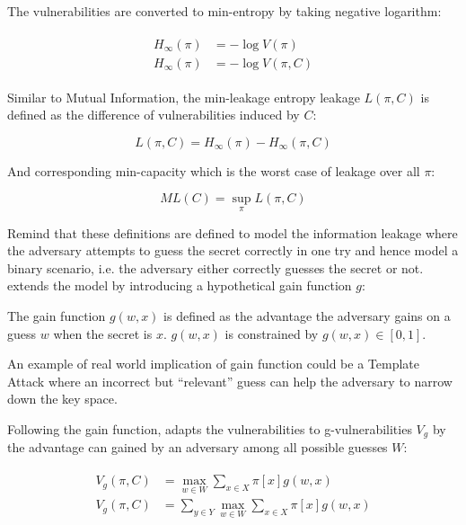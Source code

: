 \begin{definition}
	The vulnerabilities are converted to min-entropy by taking negative logarithm:
	
	\begin{eqnarray}
		\begin{aligned}
			H_{\infty}(\pi) &= -\log{V(\pi)} \\
			H_{\infty}(\pi) &= -\log{V(\pi,C)}
		\end{aligned}
	\end{eqnarray}
	
	Similar to Mutual Information, the min-leakage entropy leakage $L(\pi,C)$ is defined as the difference of vulnerabilities induced by $C$:
	
	\begin{equation}
		L(\pi, C) = H_{\infty}(\pi) - H_{\infty}(\pi, C)
	\end{equation}
	
	And corresponding min-capacity which is the worst case of leakage over all $\pi$:
	
	\begin{equation}
		ML(C) = \sup_{\pi}{L(\pi,C)}
	\end{equation}
\end{definition}

Remind that these definitions are defined to model the information leakage where the adversary attempts to guess the secret correctly in one try and hence model a binary scenario, i.e. the adversary either correctly guesses the secret or not. \cite{GLeakage} extends the model by introducing a hypothetical gain function $g$:

\begin{definition}
	The gain function $g(w,x)$ is defined as the advantage the adversary gains on a guess $w$ when the secret is $x$. $g(w,x)$ is constrained by $g(w,x) \in [0,1]$.
\end{definition}

An example of real world implication of gain function could be a Template Attack\cite{TemplateAttack} \cite{PracticalTemplate} where an incorrect but ``relevant'' guess can help the adversary to narrow down the key space.

Following the gain function, \cite{GLeakage} adapts the vulnerabilities to g-vulnerabilities $V_g$ by the advantage can gained by an adversary among all possible guesses $W$:

\begin{eqnarray}
	\begin{aligned}
		V_{g}(\pi, C) &= \max_{w \in W}\sum_{x \in X}{\pi[x]g(w,x)} \\
		V_{g}(\pi, C) &= \sum_{y \in Y}{\max_{w \in W}\sum_{x \in X}{\pi[x]g(w,x)}}
	\end{aligned}
\end{eqnarray}

